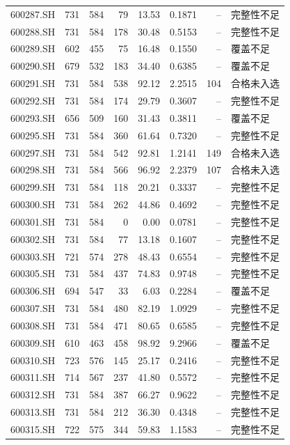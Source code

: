 \documentclass[10pt,a4paper]{article}
\begin{document}
\begin{longtable}{lrrr r r r l}
600287.SH & 731 & 584 & 79 & 13.53 & 0.1871 & -- & 完整性不足\\
600288.SH & 731 & 584 & 178 & 30.48 & 0.5153 & -- & 完整性不足\\
600289.SH & 602 & 455 & 75 & 16.48 & 0.1550 & -- & 覆盖不足\\
600290.SH & 679 & 532 & 183 & 34.40 & 0.6385 & -- & 覆盖不足\\
600291.SH & 731 & 584 & 538 & 92.12 & 2.2515 & 104 & 合格未入选\\
600292.SH & 731 & 584 & 174 & 29.79 & 0.3607 & -- & 完整性不足\\
600293.SH & 656 & 509 & 160 & 31.43 & 0.3811 & -- & 覆盖不足\\
600295.SH & 731 & 584 & 360 & 61.64 & 0.7320 & -- & 完整性不足\\
600297.SH & 731 & 584 & 542 & 92.81 & 1.2141 & 149 & 合格未入选\\
600298.SH & 731 & 584 & 566 & 96.92 & 2.2379 & 107 & 合格未入选\\
600299.SH & 731 & 584 & 118 & 20.21 & 0.3337 & -- & 完整性不足\\
600300.SH & 731 & 584 & 262 & 44.86 & 0.4692 & -- & 完整性不足\\
600301.SH & 731 & 584 & 0 & 0.00 & 0.0781 & -- & 完整性不足\\
600302.SH & 731 & 584 & 77 & 13.18 & 0.1607 & -- & 完整性不足\\
600303.SH & 721 & 574 & 278 & 48.43 & 0.6554 & -- & 完整性不足\\
600305.SH & 731 & 584 & 437 & 74.83 & 0.9748 & -- & 完整性不足\\
600306.SH & 694 & 547 & 33 & 6.03 & 0.2284 & -- & 覆盖不足\\
600307.SH & 731 & 584 & 480 & 82.19 & 1.0929 & -- & 完整性不足\\
600308.SH & 731 & 584 & 471 & 80.65 & 0.6585 & -- & 完整性不足\\
600309.SH & 610 & 463 & 458 & 98.92 & 9.2966 & -- & 覆盖不足\\
600310.SH & 723 & 576 & 145 & 25.17 & 0.2416 & -- & 完整性不足\\
600311.SH & 714 & 567 & 237 & 41.80 & 0.5572 & -- & 完整性不足\\
600312.SH & 731 & 584 & 387 & 66.27 & 0.9622 & -- & 完整性不足\\
600313.SH & 731 & 584 & 212 & 36.30 & 0.4348 & -- & 完整性不足\\
600315.SH & 722 & 575 & 344 & 59.83 & 1.1583 & -- & 完整性不足\\

\end{longtable}
\end{document}
